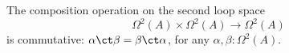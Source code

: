 %
\begin{thm}\label{thm:EckmannHilton}
  The composition operation on the second loop space
  \begin{equation*}
    \Omega^2(A)\times \Omega^2(A)\to \Omega^2(A)
  \end{equation*}
  is commutative: $\alpha\ct\beta = \beta\ct\alpha$, for any $\alpha, \beta:\Omega^2(A)$.
\end{thm}

